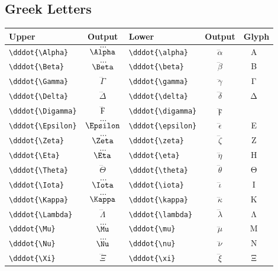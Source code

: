\documentclass[12pt,a4paper]{article}
\begin{document}
\subsection*{Greek Letters}
\begin{longtable}{|l|c|l|c|c|}
\hline
\textbf{Upper}             & \textbf{Output}    & \textbf{Lower}             & \textbf{Output}       & \textbf{Glyph} \\
\hline
\verb|\dddot{\Alpha}|      & $\dddot{\Alpha}$   & \verb|\dddot{\alpha}|      & $\dddot{\alpha}$      & Α⃛ α⃛ \\
\verb|\dddot{\Beta}|       & $\dddot{\Beta}$    & \verb|\dddot{\beta}|       & $\dddot{\beta}$       & Β⃛ β⃛ \\
\verb|\dddot{\Gamma}|      & $\dddot{\Gamma}$   & \verb|\dddot{\gamma}|      & $\dddot{\gamma}$      & Γ⃛ γ⃛ \\
\verb|\dddot{\Delta}|      & $\dddot{\Delta}$   & \verb|\dddot{\delta}|      & $\dddot{\delta}$      & Δ⃛ δ⃛ \\
\verb|\dddot{\Digamma}|    & $\dddot{\Digamma}$ & \verb|\dddot{\digamma}|    & $\dddot{\digamma}$    & Ϝ⃛ ϝ⃛ \\
\verb|\dddot{\Epsilon}|    & $\dddot{\Epsilon}$ & \verb|\dddot{\epsilon}|    & $\dddot{\epsilon}$    & Ε⃛ ϵ⃛ \\
\verb|\dddot{\Zeta}|       & $\dddot{\Zeta}$    & \verb|\dddot{\zeta}|       & $\dddot{\zeta}$       & Ζ⃛ ζ⃛ \\
\verb|\dddot{\Eta}|        & $\dddot{\Eta}$     & \verb|\dddot{\eta}|        & $\dddot{\eta}$        & Η⃛ η⃛ \\
\verb|\dddot{\Theta}|      & $\dddot{\Theta}$   & \verb|\dddot{\theta}|      & $\dddot{\theta}$      & Θ⃛ θ⃛ \\
\verb|\dddot{\Iota}|       & $\dddot{\Iota}$    & \verb|\dddot{\iota}|       & $\dddot{\iota}$       & Ι⃛ ι⃛ \\
\verb|\dddot{\Kappa}|      & $\dddot{\Kappa}$   & \verb|\dddot{\kappa}|      & $\dddot{\kappa}$      & Κ⃛ κ⃛ \\
\verb|\dddot{\Lambda}|     & $\dddot{\Lambda}$  & \verb|\dddot{\lambda}|     & $\dddot{\lambda}$     & Λ⃛ λ⃛ \\
\verb|\dddot{\Mu}|         & $\dddot{\Mu}$      & \verb|\dddot{\mu}|         & $\dddot{\mu}$         & Μ⃛ μ⃛ \\
\verb|\dddot{\Nu}|         & $\dddot{\Nu}$      & \verb|\dddot{\nu}|         & $\dddot{\nu}$         & Ν⃛ ν⃛ \\
\verb|\dddot{\Xi}|         & $\dddot{\Xi}$      & \verb|\dddot{\xi}|         & $\dddot{\xi}$         & Ξ⃛ ξ⃛ \\

\end{longtable}
\end{document}
